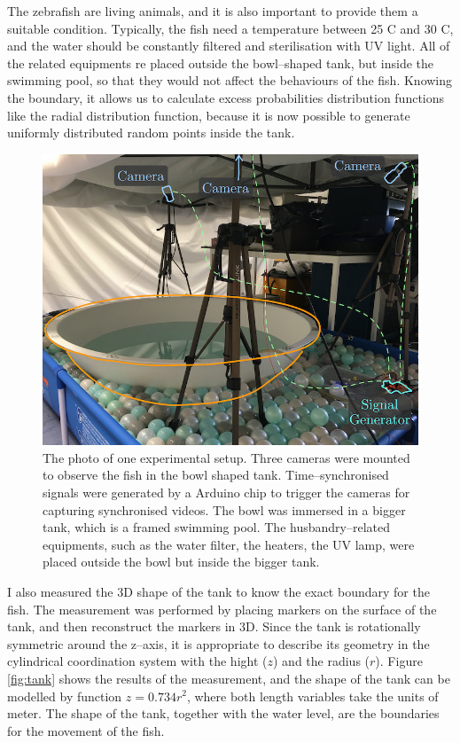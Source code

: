 \documentclass[11pt,twoside]{report}
\begin{document}
The zebrafish are living animals, and it is also important to provide them a suitable condition. Typically, the fish need a temperature between 25 \degree C and 30 \degree C, and the water should be constantly filtered and sterilisation with UV light. All of the related equipments re placed outside the bowl--shaped tank, but inside the swimming pool, so that they would not affect the behaviours of the fish. Knowing the boundary, it allows us to calculate excess probabilities distribution functions like the radial distribution function, because it is now possible to generate uniformly distributed random points inside the tank. 


\begin{figure}
  \includegraphics[width=0.8\linewidth,outer]{lab.jpg}
  \caption[Three dimensional fish tracking system]{The photo of one experimental setup. Three cameras were mounted to observe the fish in the bowl shaped tank. Time--synchronised signals were generated by a Arduino chip to trigger the cameras for capturing synchronised videos. The bowl was immersed in a bigger tank, which is a framed swimming pool. The husbandry--related equipments, such as the water filter, the heaters, the UV lamp, were placed outside the bowl but inside the bigger tank.}
  \label{fig:lab}
\end{figure}


I also measured the 3D shape of the tank to know the exact boundary for the fish. The measurement was performed by placing markers on the surface of the tank, and then reconstruct the markers in 3D. Since the tank is rotationally symmetric around the z--axis, it is appropriate to describe its geometry in the cylindrical coordination system with the hight ($z$) and the radius ($r$). Figure \ref{fig:tank} shows the results of the measurement, and the shape of the tank can be modelled by function $z=0.734 r^2$, where both length variables take the units of meter. The shape of the tank, together with the water level, are the boundaries for the movement of the fish.
\end{document}

